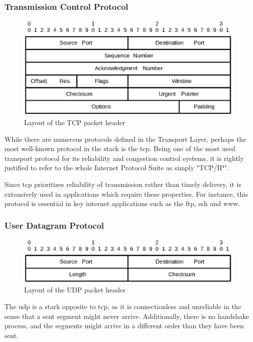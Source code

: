 \subsubsection{Transmission Control Protocol}
\begin{figure}
\includegraphics[scale=0.55]{background/tcp.eps}
\caption{Layout of the TCP packet header}
\label{fig:tcp_header}
\end{figure}

While there are numerous protocols defined in the Transport Layer, perhaps the
most well-known protocol in the stack is the \gls{tcp}.
Being one of the most used transport protocol for its reliability and congestion
control systems, it is rightly justified to refer to the whole Internet Protocol
Suite as simply "TCP/IP".

Since \gls{tcp} prioritizes reliability of transmission rather than timely
delivery, it is extensively used in applications which require these
properties. For instance, this protocol is essential in key internet applications
 such as the \gls{ftp}, \gls{ssh} and \gls{www}.


\subsubsection{User Datagram Protocol}
\begin{figure}
\includegraphics[scale=0.55]{background/udp.eps}
\caption{Layout of the UDP packet header}
\label{fig:udp_header}
\end{figure}

The \gls{udp} is a stark opposite to \gls{tcp}, as it is connectionless and
unreliable in the sense that a sent segment might never arrive.
Additionally, there is no handshake process, and the segments might arrive in
a different order than they have been sent.

